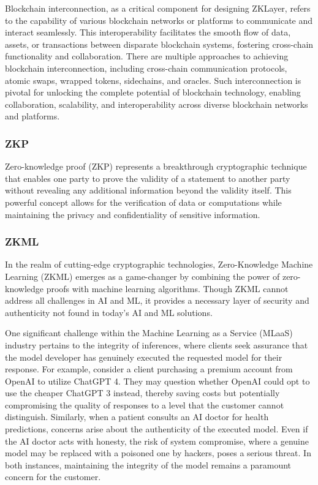 \documentclass[conference]{IEEEtran}
\begin{document}
Blockchain interconnection, as a critical component for designing ZKLayer, refers to the capability of various blockchain networks or platforms to communicate and interact seamlessly. This interoperability facilitates the smooth flow of data, assets, or transactions between disparate blockchain systems, fostering cross-chain functionality and collaboration. There are multiple approaches to achieving blockchain interconnection, including cross-chain communication protocols, atomic swaps, wrapped tokens, sidechains, and oracles. Such interconnection is pivotal for unlocking the complete potential of blockchain technology, enabling collaboration, scalability, and interoperability across diverse blockchain networks and platforms.

\subsubsection{ZKP}

Zero-knowledge proof (ZKP) represents a breakthrough cryptographic technique that enables one party to prove the validity of a statement to another party without revealing any additional information beyond the validity itself. This powerful concept allows for the verification of data or computations while maintaining the privacy and confidentiality of sensitive information.

\subsubsection{ZKML}

In the realm of cutting-edge cryptographic technologies, Zero-Knowledge Machine Learning (ZKML) emerges as a game-changer by combining the power of zero-knowledge proofs with machine learning algorithms. Though ZKML cannot address all challenges in AI and ML, it provides a necessary layer of security and authenticity not found in today's AI and ML solutions.

One significant challenge within the Machine Learning as a Service (MLaaS) industry pertains to the integrity of inferences, where clients seek assurance that the model developer has genuinely executed the requested model for their response. For example, consider a client purchasing a premium account from OpenAI to utilize ChatGPT 4. They may question whether OpenAI could opt to use the cheaper ChatGPT 3 instead, thereby saving costs but potentially compromising the quality of responses to a level that the customer cannot distinguish. Similarly, when a patient consults an AI doctor for health predictions, concerns arise about the authenticity of the executed model. Even if the AI doctor acts with honesty, the risk of system compromise, where a genuine model may be replaced with a poisoned one by hackers, poses a serious threat. In both instances, maintaining the integrity of the model remains a paramount concern for the customer.
\end{document}
